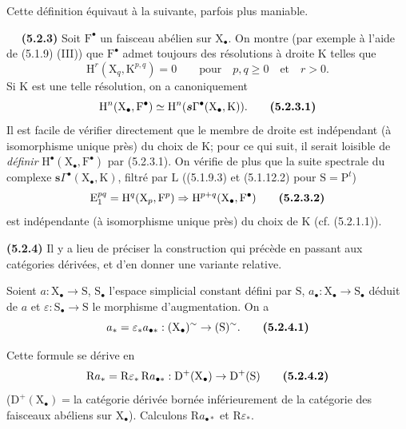 \documentclass[11pt,leqno]{article}
\newcommand{\Page}[1]{\ifvmode\noindent\else\unskip\ \fi{\footnotesize\textcolor{gray}{[p.\,#1]}}\ \ignorespaces}
\begin{document}
Cette définition équivaut à la suivante, parfois plus maniable.

\Page{13}
\textbf{(5.2.3)} Soit \(\mathrm{F}^{\bullet}\) un faisceau abélien sur \(\mathrm{X}_{\bullet}\). On montre (par exemple à l’aide de (5.1.9) (III)) que \(\mathrm{F}^{\bullet}\) admet toujours des résolutions à droite \(\mathrm{K}\) telles que
\[
\mathrm{H}^{r}(\mathrm{X}_{q},\mathrm{K}^{p,q})=0
\qquad \text{pour}\quad p,q\geq 0
\quad\text{et}\quad r>0.
\]
Si \(\mathrm{K}\) est une telle résolution, on a canoniquement
\[
\mathrm{H}^{n}(\mathrm{X}_{\bullet},\mathrm{F}^{\bullet})
\simeq
\mathrm{H}^{n}(\boldsymbol{s}\Gamma^{\bullet}(\mathrm{X}_{\bullet},\mathrm{K})).
\tag*{\textbf{(5.2.3.1)}}
\]
Il est facile de vérifier directement que le membre de droite est indépendant (à isomorphisme unique près) du choix de \(\mathrm{K}\); pour ce qui suit, il serait loisible de \textit{définir} \(\mathrm{H}^{\bullet}(\mathrm{X}_{\bullet},\mathrm{F}^{\bullet})\) par (5.2.3.1). On vérifie de plus que la suite spectrale du complexe \(\boldsymbol{s}\Gamma^{\bullet}(\mathrm{X}_{\bullet},\mathrm{K})\), filtré par \(\mathrm{L}\) ((5.1.9.3) et (5.1.12.2) pour \(\mathrm{S}=\mathrm{P}^{t}\))
\[
\mathrm{E}_{1}^{pq}=\mathrm{H}^{q}(\mathrm{X}_{p},\mathrm{F}^{p})
\Rightarrow
\mathrm{H}^{p+q}(\mathrm{X}_{\bullet},\mathrm{F}^{\bullet})
\tag*{\textbf{(5.2.3.2)}}
\]
est indépendante (à isomorphisme unique près) du choix de \(\mathrm{K}\) (cf. (5.2.1.1)).

\textbf{(5.2.4)} Il y a lieu de préciser la construction qui précède en passant aux catégories dérivées, et d’en donner une variante relative.

Soient \(a:\mathrm{X}_{\bullet}\to\mathrm{S}\), \(\mathrm{S}_{\bullet}\) l’espace simplicial constant défini par \(\mathrm{S}\), \(a_{\bullet}:\mathrm{X}_{\bullet}\to\mathrm{S}_{\bullet}\) déduit de \(a\) et \(\varepsilon:\mathrm{S}_{\bullet}\to\mathrm{S}\) le morphisme d’augmentation. On a
\[
a_*=\varepsilon_*a_{\bullet *}:
(\mathrm{X}_{\bullet})^{\sim}\to(\mathrm{S})^{\sim}.
\tag*{\textbf{(5.2.4.1)}}
\]

Cette formule se dérive en
\[
\mathrm{R}a_*=\mathrm{R}\varepsilon_*\,\mathrm{R}a_{\bullet *}:
\mathrm{D}^{+}(\mathrm{X}_{\bullet})\to\mathrm{D}^{+}(\mathrm{S})
\tag*{\textbf{(5.2.4.2)}}
\]
(\(\mathrm{D}^{+}(\mathrm{X}_{\bullet})=\)la catégorie dérivée bornée inférieurement de la catégorie des faisceaux abéliens sur \(\mathrm{X}_{\bullet}\)). Calculons \(\mathrm{R}a_{\bullet *}\) et \(\mathrm{R}\varepsilon_*\).
\end{document}
